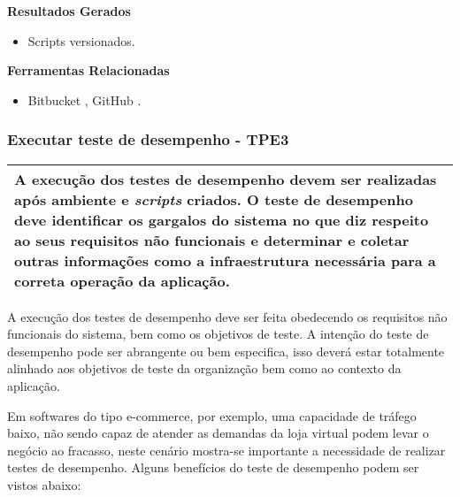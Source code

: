 \textbf{Resultados Gerados}
\begin{itemize}
    \item Scripts versionados.
\end{itemize}

\textbf{Ferramentas Relacionadas}
\begin{itemize}
   \item Bitbucket \cite{Bitbucket}, GitHub \cite{GitHub}.
\end{itemize}

\subsubsection{Executar teste de desempenho - TPE3}
\label{sec:tpe1}

\begin{table}[H]
\centering
\begin{tabular}{|p{130mm}|}
\hline
A execução dos testes de desempenho devem ser realizadas após ambiente e \textit{scripts} criados. O teste de desempenho deve identificar os gargalos do sistema no que diz respeito ao seus requisitos não funcionais e determinar e coletar outras informações como a infraestrutura necessária para a correta operação da aplicação.\\ 
\hline
\end{tabular}
\end{table}

A execução dos testes de desempenho deve ser feita obedecendo os requisitos não funcionais do sistema, bem como os objetivos de teste. A intenção do teste de desempenho pode ser abrangente ou bem especifica, isso deverá estar totalmente alinhado aos objetivos de teste da organização bem como ao contexto da aplicação.

Em softwares do tipo e-commerce, por exemplo, uma capacidade de tráfego baixo, não sendo capaz de atender as demandas da loja virtual podem levar o negócio ao fracasso, neste cenário mostra-se importante a necessidade de realizar testes de desempenho. Alguns benefícios do teste de desempenho podem ser vistos abaixo:


